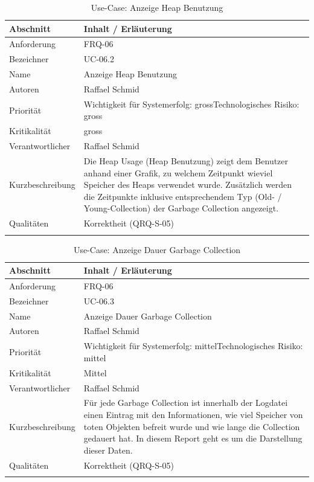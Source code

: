 \begin{longtable}{|p{4cm}|p{10.5cm}|}
\hline
   \textbf{Abschnitt} & \textbf{Inhalt / Erläuterung} \\\hline
   Anforderung & FRQ-06\\\hline
   Bezeichner & UC-06.2\\\hline
   Name & Anzeige Heap Benutzung\\\hline
   Autoren & Raffael Schmid\\\hline
   Priorität & Wichtigkeit für Systemerfolg: gross\newline Technologisches Risiko: gross\\\hline
   Kritikalität & gross\\\hline
   Verantwortlicher & Raffael Schmid\\\hline
   Kurzbeschreibung & Die Heap Usage (Heap Benutzung) zeigt dem Benutzer anhand einer Grafik, zu welchem Zeitpunkt wieviel Speicher des Heaps verwendet wurde. Zusätzlich werden die Zeitpunkte inklusive entsprechendem Typ (Old- / Young-Collection) der Garbage Collection angezeigt.  \\\hline
   Qualitäten & Korrektheit (QRQ-S-05)\\\hline
\caption{Use-Case: Anzeige Heap Benutzung}
\end{longtable}

\begin{longtable}{|p{4cm}|p{10.5cm}|}
\hline
   \textbf{Abschnitt} & \textbf{Inhalt / Erläuterung} \\\hline
   Anforderung & FRQ-06\\\hline
   Bezeichner & UC-06.3\\\hline
   Name & Anzeige Dauer Garbage Collection\\\hline
   Autoren & Raffael Schmid\\\hline
   Priorität & Wichtigkeit für Systemerfolg: mittel\newline Technologisches Risiko: mittel\\\hline
   Kritikalität & Mittel\\\hline
   Verantwortlicher & Raffael Schmid\\\hline
   Kurzbeschreibung & Für jede Garbage Collection ist innerhalb der Logdatei einen Eintrag mit den Informationen, wie viel Speicher von toten Objekten befreit wurde und wie lange die Collection gedauert hat. In diesem Report geht es um die Darstellung dieser Daten.\\\hline
   Qualitäten & Korrektheit (QRQ-S-05)\\\hline
\caption{Use-Case: Anzeige Dauer Garbage Collection}
\end{longtable}

